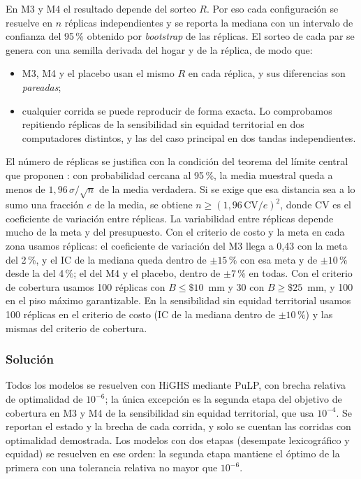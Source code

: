 En M3 y M4 el resultado depende del sorteo $R$. Por eso cada configuración se
resuelve en $n$ réplicas independientes y se reporta la mediana con un intervalo
de confianza del 95\,\% obtenido por \emph{bootstrap} de las réplicas. El sorteo
de cada par se genera con una semilla derivada del hogar y de la réplica, de modo
que:
\begin{itemize}
\item M3, M4 y el placebo usan el mismo $R$ en cada réplica, y sus diferencias
  son \emph{pareadas};
\item cualquier corrida se puede reproducir de forma exacta. Lo comprobamos
  repitiendo réplicas de la sensibilidad sin equidad territorial en dos
  computadores distintos, y las del caso principal en dos tandas independientes.
\end{itemize}
El número de réplicas se justifica con la condición del teorema del límite
central que proponen \citet[ec.~8]{hamie2024}: con probabilidad cercana al
95\,\%, la media muestral queda a menos de $1{,}96\,\sigma/\sqrt{n}$ de la media
verdadera. Si se exige que esa distancia sea a lo sumo una fracción $e$ de la
media, se obtiene $n\ge (1{,}96\,\mathrm{CV}/e)^2$, donde $\mathrm{CV}$ es el
coeficiente de variación entre réplicas. La
variabilidad entre réplicas depende mucho de la meta y del presupuesto. Con el
criterio de costo y la meta en cada zona usamos \zReplicas{} réplicas: el
coeficiente de variación del M3 llega a 0,43 con la meta del 2\,\%, y el IC de
la mediana queda dentro de $\pm 15\,\%$ con esa meta y de $\pm 10\,\%$ desde la
del 4\,\%; el del M4 y el placebo, dentro
de $\pm 7\,\%$ en todas. Con el criterio de cobertura usamos 100 réplicas con
$B\le\$10$~mm y 30 con $B\ge\$25$~mm, y 100 en el piso máximo garantizable. En
la sensibilidad sin equidad territorial usamos 100 réplicas en el criterio de
costo (IC de la mediana dentro de $\pm 10\,\%$) y las mismas del criterio de
cobertura.

\subsubsection{Solución}

Todos los modelos se resuelven con HiGHS mediante PuLP, con brecha relativa de
optimalidad de $10^{-6}$; la única excepción es la segunda etapa del objetivo de
cobertura en M3 y M4 de la sensibilidad sin equidad territorial, que usa
$10^{-4}$. Se reportan el estado y la brecha de cada
corrida, y solo se cuentan las corridas con optimalidad demostrada. Los modelos
con dos etapas (desempate lexicográfico y equidad) se resuelven en ese orden: la
segunda etapa mantiene el óptimo de la primera con una tolerancia relativa no
mayor que $10^{-6}$.
